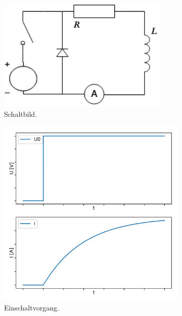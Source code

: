 \documentclass[page,pdftex,12pt,a4paper,twoside,openright]{scrbook}
\begin{document}
\begin{figure}
\centering
\begin{subfigure}[b]{0.4\textwidth}
\centering
\includegraphics[width=0.9\textwidth]{./img/schaltbild.png}
\caption{Schaltbild.}
\label{fig-schaltbild}
\end{subfigure}
\newline
\begin{subfigure}[b]{0.49\textwidth}
\centering
\includegraphics[width=\textwidth]{./img/einschalten.png}
\caption{Einschaltvorgang.}
\label{fig-einschalten}
\end{subfigure}
\begin{subfigure}[b]{0.49\textwidth}

\end{subfigure}
\end{figure}
\end{document}
